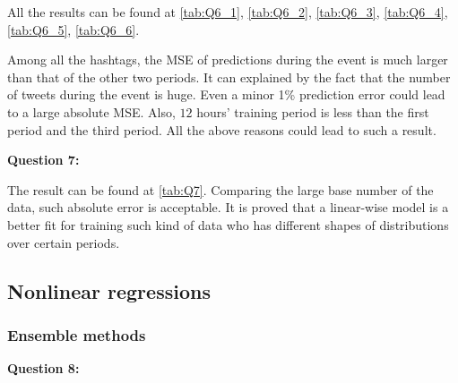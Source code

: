 \documentclass{article}
\begin{document}
\begin{table}[h]
\center
\caption{MSE and R2 Score for tweets\_\#superbowl}
\label{tab:Q6_6}
\end{table}

All the results can be found at \ref{tab:Q6_1}, \ref{tab:Q6_2}, \ref{tab:Q6_3}, \ref{tab:Q6_4}, \ref{tab:Q6_5}, \ref{tab:Q6_6}.\newline

\indent Among all the hashtags, the MSE of predictions during the event is much larger than that of the other two periods. It can explained by the fact that the number of tweets during the event is huge. Even a minor 1\% prediction error could lead to a large absolute MSE. Also, $12$ hours’ training period is less than the first period and the third period. All the above reasons could lead to such a result.

\bigbreak
\textbf{Question 7:}

\begin{table}[h]
\center
\caption{MSE and R2 Score for all aggregated data}
\label{tab:Q7}
\end{table}

The result can be found at \ref{tab:Q7}. Comparing the large base number of the data, such absolute error is acceptable. It is proved that a linear-wise model is a better fit for training such kind of data who has different shapes of distributions over certain periods.

\bigbreak
\subsection{Nonlinear regressions}
\subsubsection{Ensemble methods}
\textbf{Question 8:}
\end{document}

